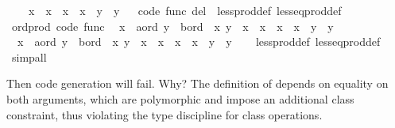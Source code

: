 \begin{isabellebody}
\ \ \ \ x{}\ {\isacharless}\ x{}\ {\isasymor}\ {\isacharparenleft}x{}\ {\isacharequal}\ x{}\ {\isasymand}\ y{}\ {\isasymle}\ y{}{\isacharparenright}{\isachardoublequoteclose}%
\isadelimproof
\ %
\endisadelimproof
%
\isatagproof
\isacommand{{\isachardot}{\isachardot}}\isamarkupfalse%
%
\endisatagproof
{\isafoldproof}%
%
\isadelimproof
%
\endisadelimproof
\isanewline
\isanewline
{}\isamarkupfalse%
\ {\isacharbrackleft}code\ func\ del{\isacharbrackright}\ {\isacharequal}\ less{\isacharunderscore}prod{\isacharunderscore}def\ less{\isacharunderscore}eq{\isacharunderscore}prod{\isacharunderscore}def\isanewline
\isanewline
{}\isamarkupfalse%
\ ord{\isacharunderscore}prod\ {\isacharbrackleft}code\ func{\isacharbrackright}{\isacharcolon}\isanewline
\ \ {\isachardoublequoteopen}{\isacharparenleft}x{}\ {\isasymColon}\ {\isacharprime}a{\isasymColon}ord{\isacharcomma}\ y{}\ {\isasymColon}\ {\isacharprime}b{\isasymColon}ord{\isacharparenright}\ {\isacharless}\ {\isacharparenleft}x{}{\isacharcomma}\ y{}{\isacharparenright}\ {\isasymlongleftrightarrow}\ x{}\ {\isacharless}\ x{}\ {\isasymor}\ {\isacharparenleft}x{}\ {\isacharequal}\ x{}\ {\isasymand}\ y{}\ {\isacharless}\ y{}{\isacharparenright}{\isachardoublequoteclose}\isanewline
\ \ {\isachardoublequoteopen}{\isacharparenleft}x{}\ {\isasymColon}\ {\isacharprime}a{\isasymColon}ord{\isacharcomma}\ y{}\ {\isasymColon}\ {\isacharprime}b{\isasymColon}ord{\isacharparenright}\ {\isasymle}\ {\isacharparenleft}x{}{\isacharcomma}\ y{}{\isacharparenright}\ {\isasymlongleftrightarrow}\ x{}\ {\isacharless}\ x{}\ {\isasymor}\ {\isacharparenleft}x{}\ {\isacharequal}\ x{}\ {\isasymand}\ y{}\ {\isasymle}\ y{}{\isacharparenright}{\isachardoublequoteclose}\isanewline
%
\isadelimproof
\ \ %
\endisadelimproof
%
\isatagproof
{}\isamarkupfalse%
\ less{\isacharunderscore}prod{\isacharunderscore}def\ less{\isacharunderscore}eq{\isacharunderscore}prod{\isacharunderscore}def\ \isamarkupfalse%
\ simp{\isacharunderscore}all%
\endisatagproof
{\isafoldproof}%
%
\isadelimproof
%
\endisadelimproof
%
\begin{isamarkuptext}%
Then code generation will fail.  Why?  The definition
  of  depends on equality on both arguments,
  which are polymorphic and impose an additional 
  class constraint, thus violating the type discipline
  for class operations.


\end{isamarkuptext}
\end{isabellebody}
